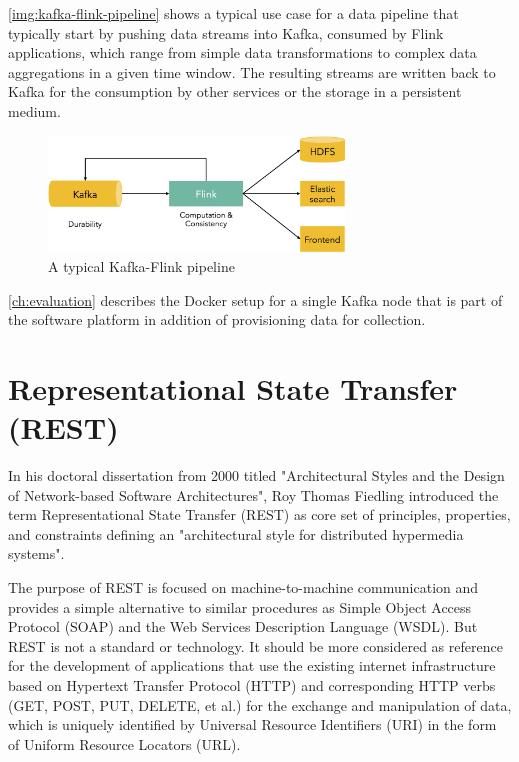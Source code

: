 \autoref{img:kafka-flink-pipeline} shows a typical use case for a data pipeline that typically start by pushing data
streams into Kafka, consumed by Flink applications, which range from simple data transformations
to complex data aggregations in a given time window. The resulting streams are written back to Kafka
for the consumption by other services or the storage in a persistent medium.
\begin{figure}[H]
	\centering
	\includegraphics[width=0.7\textwidth]{../images/05-kafka-flink-pipeline.png}
	\caption{A typical Kafka-Flink pipeline{\cite{Dartisans15}}}
	\label{img:kafka-flink-pipeline}
\end{figure}

\autoref{ch:evaluation} describes the Docker setup for a single Kafka node that is part of the
software platform in addition of provisioning data for collection.

\section{Representational State Transfer (REST)}
\label{sec:rest}
In his doctoral dissertation from 2000 titled "Architectural Styles and the Design of
Network-based Software Architectures", Roy Thomas Fiedling introduced the term
Representational State Transfer (REST) as core set of principles, properties, and
constraints defining an "architectural style for distributed hypermedia systems"\cite{Field00}.

The purpose of REST is focused on machine-to-machine communication and provides a simple alternative to similar procedures
as Simple Object Access Protocol (SOAP) and the Web Services Description Language (WSDL). But REST is not a standard or
technology. It should be more considered as reference for the development of applications that use the existing internet
infrastructure based on Hypertext Transfer Protocol (HTTP) and corresponding HTTP verbs (GET, POST, PUT, DELETE, et al.) for the
exchange and manipulation of data, which is uniquely identified by Universal Resource Identifiers (URI) in the form of
Uniform Resource Locators (URL).

